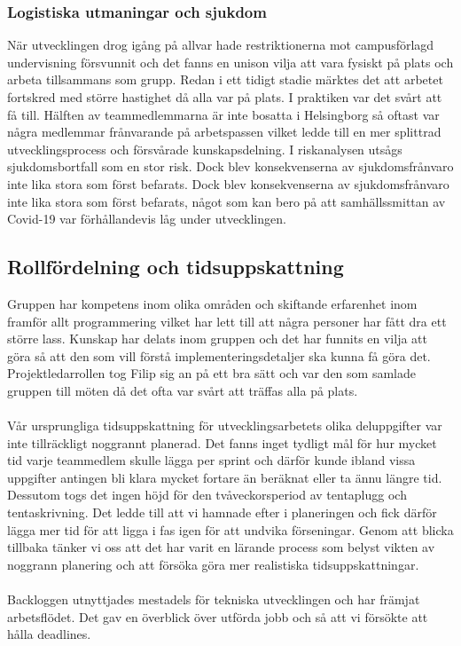 \documentclass[12pt]{article}
\begin{document}
\subsubsection{Logistiska utmaningar och sjukdom}

När utvecklingen drog igång på allvar hade restriktionerna mot campusförlagd undervisning försvunnit och det fanns en unison vilja att vara fysiskt på plats och arbeta tillsammans som grupp. Redan i ett tidigt stadie märktes det att arbetet fortskred med större hastighet då alla var på plats. I praktiken var det svårt att få till. Hälften av teammedlemmarna är inte bosatta i Helsingborg så oftast var några medlemmar frånvarande på arbetspassen vilket ledde till en mer splittrad utvecklingsprocess och försvårade kunskapsdelning. I riskanalysen utsågs sjukdomsbortfall som en stor risk. Dock blev konsekvenserna av sjukdomsfrånvaro inte lika stora som först befarats. Dock blev konsekvenserna av sjukdomsfrånvaro inte lika stora som först befarats, något som kan bero på att samhällssmittan av Covid-19 var förhållandevis låg under utvecklingen.

\subsection{Rollfördelning och tidsuppskattning}

Gruppen har kompetens inom olika områden och skiftande erfarenhet inom framför allt programmering vilket har lett till att några personer har fått dra ett större lass. Kunskap har delats inom gruppen och det har funnits en vilja att göra så att den som vill förstå implementeringsdetaljer ska kunna få göra det. Projektledarrollen tog Filip sig an på ett bra sätt och var den som samlade gruppen till möten då det ofta var svårt att träffas alla på plats.\\\\
Vår ursprungliga tidsuppskattning för utvecklingsarbetets olika deluppgifter var inte tillräckligt noggrannt planerad. Det fanns inget tydligt mål för hur mycket tid varje teammedlem skulle lägga per sprint och därför kunde ibland vissa uppgifter antingen bli klara mycket fortare än beräknat eller ta ännu längre tid. Dessutom togs det ingen höjd för den tvåveckorsperiod av tentaplugg och tentaskrivning. Det ledde till att vi hamnade efter i planeringen och fick därför lägga mer tid för att ligga i fas igen för att undvika förseningar. Genom att blicka tillbaka tänker vi oss att det har varit en lärande process som belyst vikten av noggrann planering och att försöka göra mer realistiska tidsuppskattningar. \\\\
Backloggen utnyttjades mestadels för tekniska utvecklingen och har främjat arbetsflödet. Det gav en överblick över utförda jobb och så att vi försökte att hålla deadlines.\\\
\end{document}
